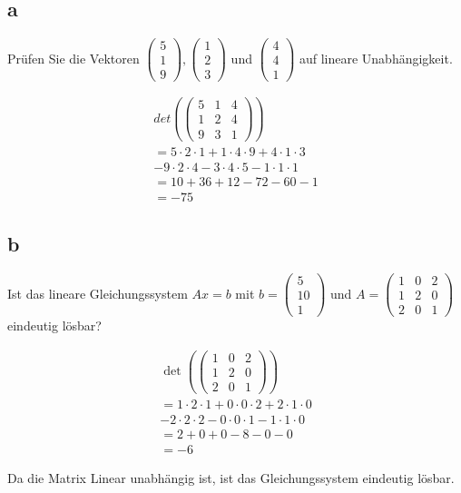 \subsection{a}
Prüfen Sie die Vektoren $\begin{pmatrix}5 \\ 1 \\ 9\end{pmatrix}, \begin{pmatrix}1 \\2 \\ 3\end{pmatrix}$ und $\begin{pmatrix}4 \\ 4 \\ 1\end{pmatrix}$ auf lineare Unabhängigkeit.

\begin{align*}
    det\left(\begin{pmatrix}
        5 & 1 & 4 \\
        1 & 2 & 4 \\
        9 & 3 & 1
    \end{pmatrix}\right) \\
    =5 \cdot 2 \cdot 1 + 1 \cdot 4 \cdot 9 + 4 \cdot 1 \cdot 3 \\
     - 9 \cdot 2 \cdot 4 - 3 \cdot 4 \cdot 5 - 1 \cdot 1 \cdot 1  \\
    = 10 + 36 + 12 - 72 - 60 - 1 \\
    = -75 
\end{align*}

\subsection{b}
Ist das lineare Gleichungssystem $Ax = b$ mit $b = \begin{pmatrix}5 \\ 10 \\ 1\end{pmatrix}$ und $A = \begin{pmatrix}1 & 0 & 2 \\ 1 & 2 & 0 \\ 2 & 0 & 1\end{pmatrix}$ eindeutig lösbar?

\begin{align*}
    \det \left(\begin{pmatrix}
        1 & 0 & 2 \\
        1 & 2 & 0 \\
        2 & 0 & 1
    \end{pmatrix}\right) \\
    = 1 \cdot 2 \cdot 1 + 0 \cdot 0 \cdot 2 + 2 \cdot 1 \cdot 0 \\
    - 2 \cdot 2 \cdot 2 - 0 \cdot 0 \cdot 1 - 1 \cdot 1 \cdot 0 \\
    = 2 + 0 + 0 - 8 - 0 - 0 \\
    = -6
\end{align*}

Da die Matrix Linear unabhängig ist, ist das Gleichungssystem eindeutig lösbar.